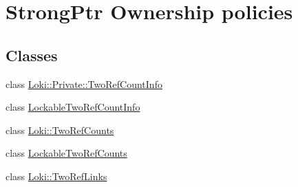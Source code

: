 \hypertarget{group__StrongPointerOwnershipGroup}{}\section{Strong\+Ptr Ownership policies}
\label{group__StrongPointerOwnershipGroup}
\subsection*{Classes}
\begin{DoxyCompactItemize}
\item 
class \hyperlink{classLoki_1_1Private_1_1TwoRefCountInfo}{Loki\+::\+Private\+::\+Two\+Ref\+Count\+Info}
\item 
class \hyperlink{classLockableTwoRefCountInfo}{Lockable\+Two\+Ref\+Count\+Info}
\item 
class \hyperlink{classLoki_1_1TwoRefCounts}{Loki\+::\+Two\+Ref\+Counts}
\item 
class \hyperlink{classLockableTwoRefCounts}{Lockable\+Two\+Ref\+Counts}
\item 
class \hyperlink{classLoki_1_1TwoRefLinks}{Loki\+::\+Two\+Ref\+Links}
\end{DoxyCompactItemize}


